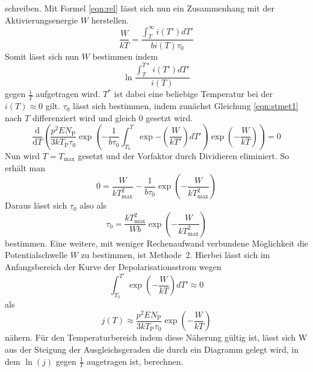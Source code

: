 schreiben. Mit Formel \ref{eqn:rel} lässt sich nun ein Zusammenhang mit
der Aktivierungsenergie $W$ herstellen.
\begin{equation}
  \frac{W}{kT}=\frac{\int_{T}^{\infty}i(T')dT'}{bi(T)\tau_{0}}
  \label{eqn:strom2}
\end{equation}
Somit lässt sich nun $W$ bestimmen indem
\begin{equation}
  \ln \frac{\int_{T}^{T*}i(T')dT'}{i(T)}
  \label{eqn:11}
\end{equation}
gegen $\frac{1}{T}$ aufgetragen wird. $T^*$ ist dabei eine beliebige Temperatur
bei der $i(T) \approx 0$ gilt.
  $\tau_{0}$ lässt sich bestimmen, indem zunächst Gleichung \ref{eqn:stmet1} nach $T$ differenziert wird und
 gleich 0 gesetzt wird.
 \begin{equation}
   \frac{\text{d}}{\text{d}T} \left( \frac{p^{2}EN_{\text{P}}}{3kT_{\text{P}}\tau_{0}} \exp{\left(-\frac{1}{b\tau_{0}}\int_{T_{0}}^{T}\exp{-\left(\frac{W}{kT'}\right)dT'}\right)}\exp{\left(-\frac{W}{kT}\right)} \right)= 0
 \end{equation}
Nun wird $T=T_{\text{max}}$ gesetzt und der Vorfaktor durch Dividieren eliminiert. So erhält man
\begin{equation}
  0=\frac{W}{kT_{\text{max}}^{2}}-\frac{1}{b\tau_{0}}\exp{\left(-\frac{W}{kT_\text{max}^2}\right)}
\end{equation}
 Daraus
 lässt sich $\tau_{0}$ also als
 \begin{equation}
   \tau_{0}=\frac{kT_\text{max}^{2}}{Wb} \exp{\left(-\frac{W}{kT_\text{max}^2}\right)}
   \label{eqn:tau}
 \end{equation}
 bestimmen.
 Eine weitere, mit weniger Rechenaufwand verbundene Möglichkeit die Potentialschwelle $W$ zu bestimmen, ist
Methode~2. Hierbei lässt sich im Anfangsbereich der Kurve der Depolarisationsstrom wegen
 \begin{equation}
 \int_{T_{0}}^{T'} \exp{\left(-\frac{W}{kT}\right)}dT' \approx 0
 \label{eqn:7}
 \end{equation}
 als
 \begin{equation}
 j(T) \approx \frac{p^{2}E N_{\text{P}}}{3k T_{\text{P}}\tau_{0}} \exp{\left(-\frac{W}{kT}\right)}
 \label{eqn:stmet1}
 \end{equation}
 nähern.
 Für den Temperaturbereich indem diese Näherung gültig ist,
 lässt sich W aus der Steigung der Ausgleichsgeraden die durch ein Diagramm gelegt wird, in dem
 $\ln(j)$ gegen $\frac{1}{T}$ augetragen ist, berechnen.\\
